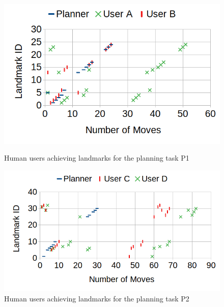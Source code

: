 \begin{figure}[tpb]
\centering
	\begin{minipage}[b]{0.46\columnwidth}
	\includegraphics[width=\columnwidth]{img/landmarkp1.png}
	\caption{Human users achieving landmarks for the planning task P1}			
	\label{fig:p1}
	\end{minipage}
	\quad
	\begin{minipage}[b]{0.50\columnwidth}
	\includegraphics[width=\columnwidth]{img/landmarkp2.png}
	\caption{Human users achieving landmarks for the planning task P2}
	\label{fig:p2}
	\end{minipage}
\end{figure}

